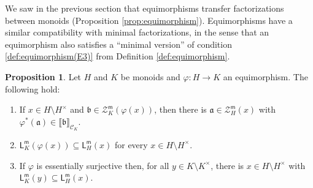 \documentclass{report}
\newcommand{\llb}{\llbracket}
\newcommand{\rrb}{\rrbracket}
\newcommand{\m}{{\mathsf{m}}}
\renewcommand{\:}{\text{:}}
\theoremstyle{definition}
\newtheorem{prop}[defn]{Proposition}
\begin{document}
%
We saw in the previous section that equimorphisms transfer factorizations between monoids (Proposition \ref{prop:equimorphism}).  
Equimorphisms have a similar compatibility with minimal factorizations, in the sense that an equimorphism also satisfies a ``minimal version'' of condition \ref{def:equimorphism(E3)} from Definition \ref{def:equimorphism}.
%
%
%
\begin{prop}\label{prop:min-equi}
	Let $H$ and $K$ be monoids and $\varphi: H\to K$ an equimorphism. The following hold: 
	\begin{enumerate}[label={\rm (\roman{*})}]
		\item\label{it:prop:min-equi(i)} If $x\in H \setminus H^\times$ and $\mathfrak{b}\in \mathcal{Z}_K^\m(\varphi(x))$, then there is $\mathfrak{a}\in \mathcal{Z}_H^\m(x)$ with $\varphi^*(\mathfrak{a})\in \llb \mathfrak{b} \rrb_{\mathscr{C}_K}$.
		\item\label{it:prop:min-equi(ii)} $\mathsf{L}_K^\m(\varphi(x)) \subseteq \mathsf{L}_H^\m(x)$ for every $x\in H\setminus H^\times$.
		\item\label{it:prop:min-equi(iii)} If $\varphi$ is essentially surjective then, for all $y\in K\setminus K^\times$, there is $x\in H\setminus H^\times$ with $\mathsf{L}_K^\m(y) \subseteq \mathsf{L}_H^\m(x)$. 
	\end{enumerate}
\end{prop}
%
\end{document}
